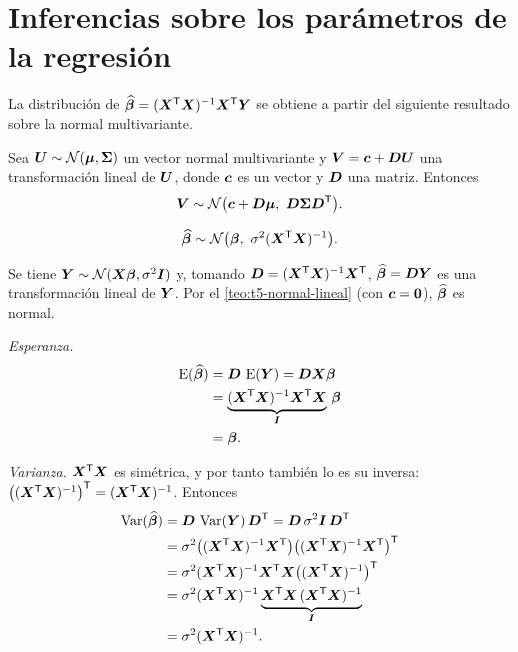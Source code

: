 \section{Inferencias sobre los parámetros de la regresión}
\label{sec:t5-parametros}

La distribución de $\widehat{\bm{\beta}}=(\bm{X}^{\mathsf{T}}\bm{X})^{-1}\bm{X}^{\mathsf{T}}\bm{Y}$ se obtiene a partir del siguiente resultado
sobre la normal multivariante.

\begin{teorema}
  Sea $\bm{U}\sim\mathcal{N}(\bm{\mu},\bm{\Sigma})$ un vector normal multivariante y
  $\bm{V}=\bm{c}+\bm{D}\bm{U}$ una transformación lineal de $\bm{U}$, donde $\bm{c}$ es
  un vector y $\bm{D}$ una matriz. Entonces
  \[
    \vect{V}\sim\Normal\big(\vect{c}+\vect{D}\vect{\mu},\ \vect{D}\vect{\Sigma}\vect{D}\T\big).
  \]
\end{teorema}

\begin{teorema}
  \[
    \bhat\sim\Normal\big(\vect{\beta},\ \sigma^2\XtXi\big).
  \]
\end{teorema}

\begin{demostracion}
  Se tiene $\bm{Y}\sim\mathcal{N}(\bm{X}\bm{\beta},\sigma^2\bm{I})$ y, tomando
  $\bm{D}=(\bm{X}^{\mathsf{T}}\bm{X})^{-1}\bm{X}^{\mathsf{T}}$, $\widehat{\bm{\beta}}=\bm{D}\bm{Y}$ es una transformación lineal de $\bm{Y}$.
  Por el \cref{teo:t5-normal-lineal} (con $\bm{c}=\bm{0}$), $\widehat{\bm{\beta}}$ es normal.

  \emph{Esperanza.}
  \begin{align*}
    \operatorname{E}(\widehat{\bm{\beta}}) &= \bm{D}\,\operatorname{E}(\bm{Y}) = \bm{D}\bm{X}\bm{\beta} \\
    &= \underbrace{(\bm{X}^{\mathsf{T}}\bm{X})^{-1}\bm{X}^{\mathsf{T}}\bm{X}}_{\bm{I}}\,\bm{\beta} \\
    &= \bm{\beta} .
  \end{align*}

  \emph{Varianza.} $\bm{X}^{\mathsf{T}}\bm{X}$ es simétrica, y por tanto también lo es su inversa:
  $\big((\bm{X}^{\mathsf{T}}\bm{X})^{-1}\big)^{\mathsf{T}}=(\bm{X}^{\mathsf{T}}\bm{X})^{-1}$. Entonces
  \begin{align*}
    \operatorname{Var}(\widehat{\bm{\beta}}) &= \bm{D}\,\operatorname{Var}(\bm{Y})\,\bm{D}^{\mathsf{T}} = \bm{D}\,\sigma^2\bm{I}\,\bm{D}^{\mathsf{T}} \\
    &= \sigma^2\big((\bm{X}^{\mathsf{T}}\bm{X})^{-1}\bm{X}^{\mathsf{T}}\big)\big((\bm{X}^{\mathsf{T}}\bm{X})^{-1}\bm{X}^{\mathsf{T}}\big)^{\mathsf{T}} \\
    &= \sigma^2(\bm{X}^{\mathsf{T}}\bm{X})^{-1}\bm{X}^{\mathsf{T}}\bm{X}\big((\bm{X}^{\mathsf{T}}\bm{X})^{-1}\big)^{\mathsf{T}} \\
    &= \sigma^2(\bm{X}^{\mathsf{T}}\bm{X})^{-1}\underbrace{\bm{X}^{\mathsf{T}}\bm{X}\,(\bm{X}^{\mathsf{T}}\bm{X})^{-1}}_{\bm{I}} \\
    &= \sigma^2(\bm{X}^{\mathsf{T}}\bm{X})^{-1} .
  \end{align*}
\end{demostracion}

